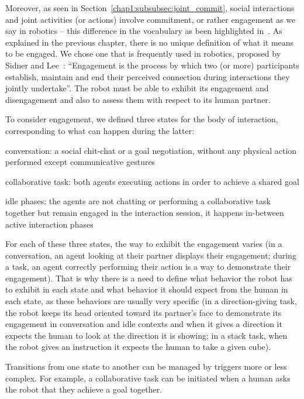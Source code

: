 \documentclass[a4paper,11pt,twoside]{StyleThese}
\begin{document}
Moreover, as seen in Section~\ref{chap1:subsubsec:joint_commit}, social interactions and joint activities (or actions) involve commitment, or rather engagement as we say in robotics -- this difference in the vocabulary as been highlighted in~\cite{castro_2019_commitments}. As explained in the previous chapter, there is no unique definition of what it means to be engaged. We chose one that is frequently used in robotics, proposed by Sidner and Lee~\cite{sidner_2003_engagement}: ``Engagement is the process by which two (or more) participants establish, maintain and end their perceived connection during interactions they jointly undertake''. The robot must be able to exhibit its engagement and disengagement and also to assess them with respect to its human partner.

To consider engagement, we defined three states for the body of interaction, corresponding to what can happen during the latter: 
\begin{bulletList}
	\item conversation: a social chit-chat or a goal negotiation, without any physical action performed except communicative gestures
	\item collaborative task: both agents executing actions in order to achieve a shared goal
	\item idle phases: the agents are not chatting or performing a collaborative task together but remain engaged in the interaction session, it happens in-between active interaction phases
\end{bulletList}

For each of these three states, the way to exhibit the engagement varies (\eg in a conversation, an agent looking at their partner displays their engagement; during a task, an agent correctly performing their action is a way to demonstrate their engagement). That is why there is a need to define what behavior the robot has to exhibit in each state and what behavior it should expect from the human in each state, as these behaviors are usually very specific (\eg in a direction-giving task, the robot keeps its head oriented toward its partner's face to demonstrate its engagement in conversation and idle contexts and when it gives a direction it expects the human to look at the direction it is showing; in a stack task, when the robot gives an instruction it expects the human to take a given cube).

Transitions from one state to another can be managed by triggers more or less complex. For example, a collaborative task can be initiated when a human asks the robot that they achieve a goal together.
\end{document}

